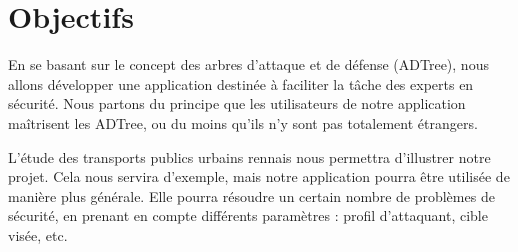 \section{Objectifs}
	\label{sec:objectifs}
	
	En se basant sur le concept des arbres d’attaque et de défense (ADTree), nous allons développer une application destinée à faciliter la tâche des experts en sécurité. Nous partons du principe que les utilisateurs de notre application maîtrisent les ADTree, ou du moins qu’ils n’y sont pas totalement étrangers.

	L’étude des transports publics urbains rennais nous permettra d’illustrer notre projet. Cela nous servira d’exemple, mais notre application pourra être utilisée de manière plus générale. Elle pourra résoudre un certain nombre de problèmes de sécurité, en prenant en compte différents paramètres : profil d’attaquant, cible visée, etc. 




